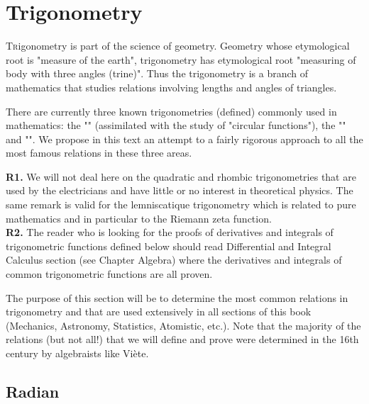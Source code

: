 	\newpage
	\thispagestyle{empty}
	\mbox{}
	\section{Trigonometry}\label{trigonometry}
	\lettrine[lines=4]{\color{BrickRed}T}rigonometry is part of the science of geometry. Geometry whose etymological root is "measure of the earth", trigonometry has etymological root "measuring of body with three angles (trine)". Thus the trigonometry is a branch of mathematics that studies relations involving lengths and angles of triangles.
	
	There are currently three known trigonometries (defined) commonly used in mathematics: the "" (assimilated with the study of "circular functions"), the  "" and  "". We propose in this text an attempt to a fairly rigorous approach to all the most famous relations in these three areas.
	
	\begin{tcolorbox}[title=Remarks,colframe=black,arc=10pt]
	\textbf{R1.} We will not deal here on the quadratic and rhombic trigonometries that are used by the electricians and have little or no interest in theoretical physics. The same remark is valid for the lemniscatique trigonometry which is related to pure mathematics and in particular to the Riemann zeta function.\\
	
	\textbf{R2.} The reader who is looking for the proofs of derivatives and integrals of trigonometric functions defined below should read Differential and Integral Calculus section (see Chapter Algebra) where the derivatives and integrals of common trigonometric functions are all proven.
	\end{tcolorbox}	

	The purpose of this section will be to determine the most common relations in trigonometry and that are used extensively in all sections of this book (Mechanics, Astronomy, Statistics, Atomistic, etc.). Note that the majority of the relations (but not all!) that we will define and prove were determined in the 16th century by algebraists like Viète.

	\subsection{Radian}\label{radian}

